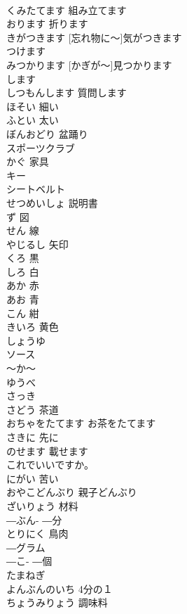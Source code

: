 \documentclass[8pt]{extreport}
\begin{document}
\begin{CJK}{UTF8}{min}
\\	くみたてます	組み立てます	
\\	おります	折ります	
\\	[わすれものに～] きがつきます	[忘れ物に～]気がつきます	
\\	[しょうゆを～] つけます			
\\	[かぎが～]みつかります	[かぎが～]見つかります	
\\	[ネクタイを～]します			
\\	しつもんします	質問します	
\\	ほそい	細い	
\\	ふとい	太い	
\\	ぼんおどり	盆踊り	
\\	スポーツクラブ			
\\	かぐ	家具	
\\	キー			
\\	シートベルト			
\\	せつめいしょ	説明書	
\\	ず	図	
\\	せん	線	
\\	やじるし	矢印	
\\	くろ	黒	
\\	しろ	白	
\\	あか	赤	
\\	あお	青	
\\	こん	紺	
\\	きいろ	黄色	
\\	しょうゆ			
\\	ソース			
\\	～か～			
\\	ゆうべ			
\\	さっき			
\\	さどう	茶道	
\\	おちゃをたてます	お茶をたてます	
\\	さきに	先に	
\\	のせます	載せます	
\\	これでいいですか。			
\\	にがい	苦い	
\\	おやこどんぶり	親子どんぶり	
\\	ざいりょう	材料	
\\	―ぶん-	―分	
\\	とりにく	鳥肉	
\\	―グラム			
\\	―こ-	―個	
\\	たまねぎ			
\\	よんぶんのいち	4分の１　
\\	ちょうみりょう	調味料	

\end{CJK}
\end{document}
